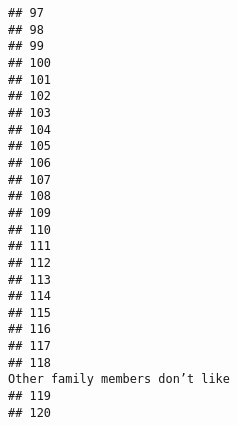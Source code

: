 \documentclass[
]{article}
\begin{document}
\begin{verbatim}
## 97                                                                                                         
## 98                                                                                                         
## 99                                                                                                         
## 100                                                                                                        
## 101                                                                                                        
## 102                                                                                                        
## 103                                                                                                        
## 104                                                                                                        
## 105                                                                                                        
## 106                                                                                                        
## 107                                                                                                        
## 108                                                                                                        
## 109                                                                                                        
## 110                                                                                                        
## 111                                                                                                        
## 112                                                                                                        
## 113                                                                                                        
## 114                                                                                                        
## 115                                                                                                        
## 116                                                                                                        
## 117                                                                                                        
## 118                                                                         Other family members don’t like
## 119                                                                                                        
## 120                                                                                                        

\end{verbatim}
\end{document}
